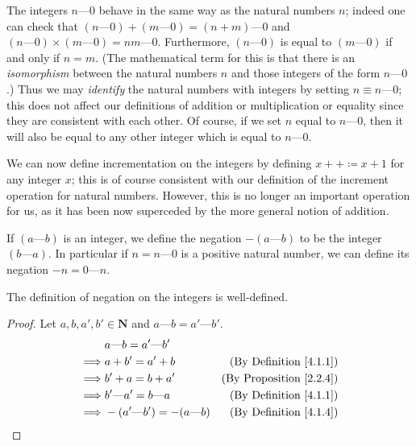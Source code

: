 \begin{note}
    The integers \(n \text{---} 0\) behave in the same way as the natural numbers \(n\);
    indeed one can check that \((n \text{---} 0) + (m \text{---} 0) = (n + m) \text{---} 0\) and \((n \text{---} 0) \times (m \text{---} 0) = nm \text{---} 0\).
    Furthermore, \((n \text{---} 0)\) is equal to \((m \text{---} 0)\) if and only if \(n = m\).
    (The mathematical term for this is that there is an \emph{isomorphism} between the natural numbers \(n\) and those integers of the form \(n \text{---} 0\).)
    Thus we may \emph{identify} the natural numbers with integers by setting \(n \equiv n \text{---} 0\);
    this does not affect our definitions of addition or multiplication or equality since they are consistent with each other.
    Of course, if we set \(n\) equal to \(n \text{---} 0\), then it will also be equal to any other integer which is equal to \(n \text{---} 0\).
\end{note}

\begin{note}
    We can now define incrementation on the integers by defining \(x++ \coloneqq x + 1\) for any integer \(x\);
    this is of course consistent with our definition of the increment operation for natural numbers.
    However, this is no longer an important operation for us, as it has been now superceded by the more general notion of addition.
\end{note}

\begin{definition}\label{4.1.4}
    If \((a \text{---} b)\) is an integer, we define the negation \(-(a \text{---} b)\) to be the integer \((b \text{---} a)\).
    In particular if \(n = n \text{---} 0\) is a positive natural number, we can define its negation \(-n = 0 \text{---} n\).
\end{definition}

\begin{additional corollary}\label{ac 4.1.2}
The definition of negation on the integers is well-defined.
\end{additional corollary}

\begin{proof}
    Let \(a, b, a', b' \in \mathbf{N}\) and \(a \text{---} b = a' \text{---} b'\).
    \begin{align*}
                 & a \text{---} b = a' \text{---} b'                                             \\
        \implies & a + b' = a' + b                         & \text{(By Definition \ref{4.1.1})}  \\
        \implies & b' + a = b + a'                         & \text{(By Proposition \ref{2.2.4})} \\
        \implies & b' \text{---} a' = b \text{---} a       & \text{(By Definition \ref{4.1.1})}  \\
        \implies & -(a' \text{---} b') = -(a \text{---} b) & \text{(By Definition \ref{4.1.4})}  \\
    \end{align*}
\end{proof}

